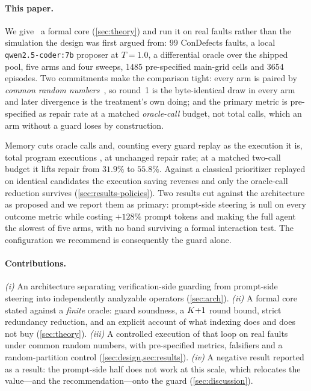 \paragraph{This paper.}
We give \CEGMem\ a formal core (\cref{sec:theory}) and run it on real faults
rather than the simulation the design was first argued from: $99$ ConDefects
faults, a local \texttt{qwen2.5-coder:7b} proposer at $T = 1.0$, a differential
oracle over the shipped pool, five arms and four sweeps, \num{1485}
pre-specified main-grid cells and \num{3654} episodes. Two commitments make the
comparison tight: every arm is paired by \emph{common random
numbers}~\cite{law2000simulation}, so round~1 is the byte-identical draw in
every arm and later divergence is the treatment's own doing; and the primary
metric is pre-specified as repair rate at a matched \emph{oracle-call} budget,
not total calls, which an arm without a guard loses by construction.

Memory cuts oracle calls  and, counting every guard replay as the
execution it is, total program executions , at unchanged repair rate;
at a matched two-call budget it lifts repair from $31.9\%$ to $55.8\%$. Against
a classical prioritizer replayed on identical candidates the execution saving
reverses and only the oracle-call reduction survives
(\cref{sec:results-policies}). Two
results cut against the architecture as proposed and we report them as primary:
prompt-side steering is null on every outcome metric while costing $+128\%$
prompt tokens and making the full agent the slowest of five arms, with no band
surviving a formal interaction test. The configuration we recommend is
consequently the guard alone.

\paragraph{Contributions.}
\emph{(i)} An architecture separating verification-side guarding from
prompt-side steering into independently analyzable operators
(\cref{sec:arch}).
\emph{(ii)} A formal core stated against a \emph{finite} oracle: guard
soundness, a $K{+}1$ round bound, strict redundancy reduction, and an
explicit account of what indexing does and does not buy (\cref{sec:theory}).
\emph{(iii)} A controlled execution of that loop on real faults under common
random numbers, with pre-specified metrics, falsifiers and a random-partition
control (\cref{sec:design,sec:results}).
\emph{(iv)} A negative result reported as a result: the prompt-side half does
not work at this scale, which relocates the value---and the
recommendation---onto the guard (\cref{sec:discussion}).
